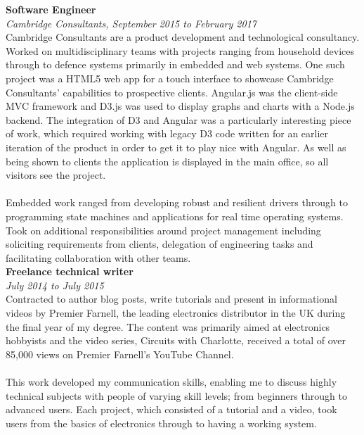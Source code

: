 \documentclass{article}
\begin{document}
\begin{flushleft}
\textbf{Software Engineer}\\
\textit{Cambridge Consultants, September 2015 to February 2017}\\[5pt]
Cambridge Consultants are a product development and technological consultancy. Worked on multidisciplinary teams with projects ranging from household devices through to defence systems primarily in embedded and web systems. One such project was a HTML5 web app for a touch interface to showcase Cambridge Consultants' capabilities to prospective clients. Angular.js was the client-side MVC framework and D3.js was used to display graphs and charts with a Node.js backend. The integration of D3 and Angular was a particularly interesting piece of work, which required working with legacy D3 code written for an earlier iteration of the product in order to get it to play nice with Angular. As well as being shown to clients the application is displayed in the main office, so all visitors see the project.

\paragraph{}Embedded work ranged from developing robust and resilient drivers through to programming state machines and applications for real time operating systems. Took on additional responsibilities around project management including soliciting requirements from clients, delegation of engineering tasks and facilitating collaboration with other teams.\\[10pt]

\textbf{Freelance technical writer}\\
\textit{July 2014 to July 2015}\\[5pt]
Contracted to author blog posts, write tutorials and present in informational videos by Premier Farnell, the leading electronics distributor in the UK during the final year of my degree. The content was primarily aimed at electronics hobbyists and the video series, Circuits with Charlotte, received a total of over 85,000 views on Premier Farnell's YouTube Channel.

\paragraph{}This work developed my communication skills, enabling me to discuss highly technical subjects with people of varying skill levels; from beginners through to advanced users. Each project, which consisted of a tutorial and a video, took users from the basics of electronics through to having a working system.


\end{flushleft}
\end{document}
